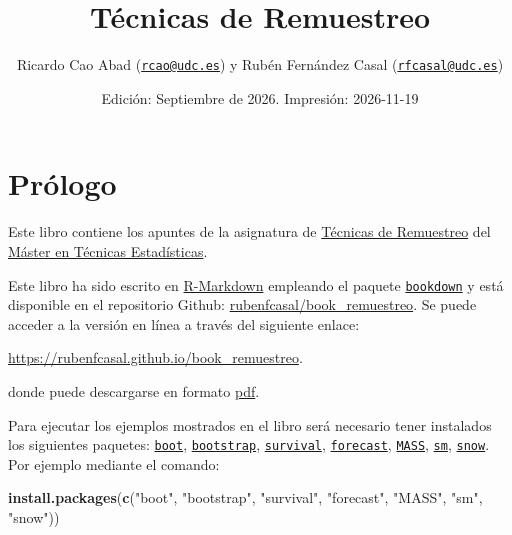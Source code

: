 \documentclass[
]{book}
\title{Técnicas de Remuestreo}
\author{Ricardo Cao Abad (\href{mailto:rcao@udc.es}{\nolinkurl{rcao@udc.es}}) y Rubén Fernández Casal (\href{mailto:rfcasal@udc.es}{\nolinkurl{rfcasal@udc.es}})}
\date{Edición: Septiembre de 2026. Impresión: 2026-11-19}
\newenvironment{Shaded}{\begin{snugshade}}{\end{snugshade}}
\newcommand{\FunctionTok}[1]{\textcolor[rgb]{0.13,0.29,0.53}{\textbf{#1}}}
\newcommand{\NormalTok}[1]{#1}
\newcommand{\StringTok}[1]{\textcolor[rgb]{0.31,0.60,0.02}{#1}}
\theoremstyle{break}
\theoremstyle{nonumberplain}
\begin{document}
\maketitle

{
\setcounter{tocdepth}{1}
\tableofcontents
}
\chapter*{Prólogo}\label{pruxf3logo}

Este libro contiene los apuntes de la asignatura de \href{http://eamo.usc.es/pub/mte/index.php/es/?option=com_content&view=article&id=2202&idm=22&a\%C3\%B1o=2019}{Técnicas de Remuestreo} del \href{http://eio.usc.es/pub/mte}{Máster en Técnicas Estadísticas}.

Este libro ha sido escrito en \href{http://rmarkdown.rstudio.com}{R-Markdown} empleando el paquete \href{https://bookdown.org/yihui/bookdown/}{\texttt{bookdown}} y está disponible en el repositorio Github: \href{https://github.com/rubenfcasal/book_remuestreo}{rubenfcasal/book\_remuestreo}.
Se puede acceder a la versión en línea a través del siguiente enlace:

\url{https://rubenfcasal.github.io/book_remuestreo}.

donde puede descargarse en formato \href{https://rubenfcasal.github.io/book_remuestreo/book_remuestreo.pdf}{pdf}.

Para ejecutar los ejemplos mostrados en el libro será necesario tener instalados los siguientes paquetes:
\href{https://CRAN.R-project.org/package=boot}{\texttt{boot}}, \href{https://CRAN.R-project.org/package=bootstrap}{\texttt{bootstrap}}, \href{https://CRAN.R-project.org/package=survival}{\texttt{survival}}, \href{https://CRAN.R-project.org/package=forecast}{\texttt{forecast}}, \href{https://CRAN.R-project.org/package=MASS}{\texttt{MASS}}, \href{https://CRAN.R-project.org/package=sm}{\texttt{sm}}, \href{https://CRAN.R-project.org/package=snow}{\texttt{snow}}.
Por ejemplo mediante el comando:

\begin{Shaded}
\begin{Highlighting}[]
\FunctionTok{install.packages}\NormalTok{(}\FunctionTok{c}\NormalTok{(}\StringTok{"boot"}\NormalTok{, }\StringTok{"bootstrap"}\NormalTok{, }\StringTok{"survival"}\NormalTok{, }\StringTok{"forecast"}\NormalTok{, }\StringTok{"MASS"}\NormalTok{, }\StringTok{"sm"}\NormalTok{, }\StringTok{"snow"}\NormalTok{))}
\end{Highlighting}
\end{Shaded}
\end{document}
